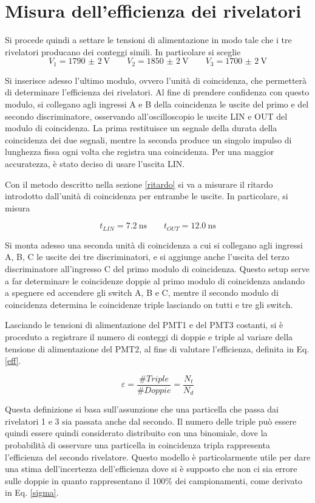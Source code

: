 \documentclass[10pt,a4paper]{article}
\begin{document}
\section{Misura dell'efficienza dei rivelatori}
Si procede quindi a settare le tensioni di alimentazione in modo tale che i tre rivelatori producano dei conteggi simili. In particolare si sceglie
\[ V_1=\SI{1790(2)}{\volt} \quad\quad V_2=\SI{1850(2)}{\volt} \quad\quad V_3=\SI{1700(2)}{\volt} \]

Si inserisce adesso l'ultimo modulo, ovvero l'unità di coincidenza, che permetterà di determinare l'efficienza dei rivelatori. Al fine di prendere confidenza con questo modulo, si collegano agli ingressi A e B della coincidenza le uscite del primo e del secondo discriminatore, osservando all'oscilloscopio le uscite LIN e OUT del modulo di coincidenza. La prima restituisce un segnale della durata della coincidenza dei due segnali, mentre la seconda produce un singolo impulso di lunghezza fissa ogni volta che registra una coincidenza. Per una maggior accuratezza, è stato deciso di usare l'uscita LIN. %

Con il metodo descritto nella sezione \ref{ritardo} si va a misurare il ritardo introdotto dall'unità di coincidenza per entrambe le uscite. In particolare, si misura

\[t_{LIN}=\SI{7.2}{\nano \second} \qquad t_{OUT}=\SI{12.0}{\nano\second} \]

Si monta adesso una seconda unità di coincidenza a cui si collegano agli ingressi A, B, C le uscite dei tre discriminatori, e si aggiunge anche l'uscita del terzo discriminatore all'ingresso C del primo modulo di coincidenza. Questo setup serve a far determinare le coincidenze doppie al primo modulo di coincidenza andando a spegnere ed accendere gli switch A, B e C, mentre il secondo modulo di coincidenza determina le coincidenze triple lasciando on tutti e tre gli switch. 

Lasciando le tensioni di alimentazione del PMT1 e del PMT3 costanti, si è proceduto a registrare il numero di conteggi di doppie e triple al variare della tensione di alimentazione del PMT2, al fine di valutare l'efficienza, definita in Eq. \eqref{eff}.

\begin{equation}
    \varepsilon=\frac{\# Triple}{\# Doppie}=\frac{N_t}{N_d}\label{eff}
\end{equation}

Questa definizione si basa sull'assunzione che una particella che passa dai rivelatori 1 e 3 sia passata anche dal secondo. Il numero delle triple può essere quindi essere quindi considerato distribuito con una binomiale, dove la probabilità di osservare una particella in coincidenza tripla rappresenta l'efficienza del secondo rivelatore. Questo modello è particolarmente utile per dare una stima dell'incertezza dell'efficienza dove si è supposto che non ci sia errore sulle doppie in quanto rappresentano il 100\% dei campionamenti, come derivato in Eq. \eqref{sigma}.
\end{document}
